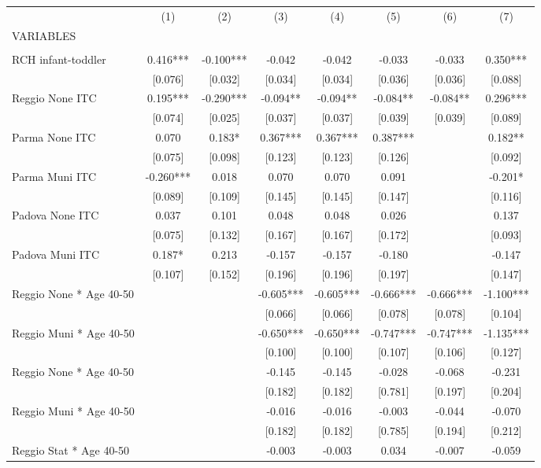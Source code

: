 \begin{tabular}{lccccccc} \hline
 & (1) & (2) & (3) & (4) & (5) & (6) & (7) \\
VARIABLES &  &  &  &  &  &  &  \\ \hline
 &  &  &  &  &  &  &  \\
RCH infant-toddler & 0.416*** & -0.100*** & -0.042 & -0.042 & -0.033 & -0.033 & 0.350*** \\
 & [0.076] & [0.032] & [0.034] & [0.034] & [0.036] & [0.036] & [0.088] \\
Reggio None ITC & 0.195*** & -0.290*** & -0.094** & -0.094** & -0.084** & -0.084** & 0.296*** \\
 & [0.074] & [0.025] & [0.037] & [0.037] & [0.039] & [0.039] & [0.089] \\
Parma None ITC & 0.070 & 0.183* & 0.367*** & 0.367*** & 0.387*** &  & 0.182** \\
 & [0.075] & [0.098] & [0.123] & [0.123] & [0.126] &  & [0.092] \\
Parma Muni ITC & -0.260*** & 0.018 & 0.070 & 0.070 & 0.091 &  & -0.201* \\
 & [0.089] & [0.109] & [0.145] & [0.145] & [0.147] &  & [0.116] \\
Padova None ITC & 0.037 & 0.101 & 0.048 & 0.048 & 0.026 &  & 0.137 \\
 & [0.075] & [0.132] & [0.167] & [0.167] & [0.172] &  & [0.093] \\
Padova Muni ITC & 0.187* & 0.213 & -0.157 & -0.157 & -0.180 &  & -0.147 \\
 & [0.107] & [0.152] & [0.196] & [0.196] & [0.197] &  & [0.147] \\
Reggio None * Age 40-50 &  &  & -0.605*** & -0.605*** & -0.666*** & -0.666*** & -1.100*** \\
 &  &  & [0.066] & [0.066] & [0.078] & [0.078] & [0.104] \\
Reggio Muni * Age 40-50 &  &  & -0.650*** & -0.650*** & -0.747*** & -0.747*** & -1.135*** \\
 &  &  & [0.100] & [0.100] & [0.107] & [0.106] & [0.127] \\
Reggio None * Age 40-50 &  &  & -0.145 & -0.145 & -0.028 & -0.068 & -0.231 \\
 &  &  & [0.182] & [0.182] & [0.781] & [0.197] & [0.204] \\
Reggio Muni * Age 40-50 &  &  & -0.016 & -0.016 & -0.003 & -0.044 & -0.070 \\
 &  &  & [0.182] & [0.182] & [0.785] & [0.194] & [0.212] \\
Reggio Stat * Age 40-50 &  &  & -0.003 & -0.003 & 0.034 & -0.007 & -0.059 \\

\end{tabular}
